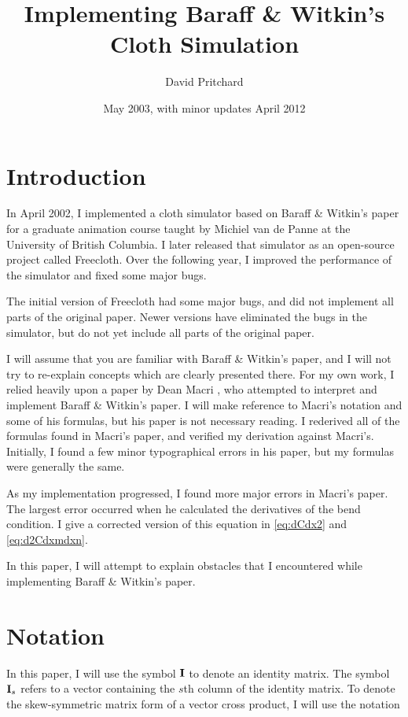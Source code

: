 \documentclass[twocolumn]{article}
\title{Implementing Baraff \& Witkin's Cloth Simulation}
\author{David Pritchard}
\date{May 2003, with minor updates April 2012}
\newcommand{\I}{{\bf I}}
\newcommand{\Is}{{\bf I}_s}
\begin{document}
\maketitle

\section{Introduction}

In April 2002, I implemented a cloth simulator based on Baraff \& Witkin's
paper \cite{baraff98} for a graduate animation course taught by Michiel van
de Panne at the University of British Columbia. I later released that
simulator as an open-source project called Freecloth. Over the following year,
I improved the performance of the simulator and fixed some major bugs.

The initial version of Freecloth had some major bugs, and did not implement
all parts of the original paper. Newer versions have eliminated the bugs in
the simulator, but do not yet include all parts of the original paper.

I will assume that you are familiar with Baraff \& Witkin's
paper, and I will not try to re-explain concepts which are clearly presented
there. For my own work, I relied heavily upon a paper by Dean Macri
\cite{macri00}, who attempted to interpret and implement Baraff \& Witkin's
paper. I will make reference to Macri's notation and some of his formulas,
but his paper is not necessary reading. I rederived all of the formulas found
in Macri's paper, and verified my derivation against Macri's. Initially, I
found a few minor typographical errors in his paper, but my formulas were
generally the same.

As my implementation progressed, I found more major errors in Macri's paper.
The largest error occurred when he calculated the derivatives of the bend
condition. I give a corrected version of this equation in \eqref{eq:dCdx2} and
\eqref{eq:d2Cdxmdxn}.

In this paper, I will attempt to explain obstacles that I encountered while
implementing Baraff \& Witkin's paper.

\section{Notation}

In this paper, I will use the symbol $\I$ to denote an identity matrix. The
symbol $\Is$ refers to a vector containing the $s$th column of the identity
matrix. To
denote the skew-symmetric matrix form of a vector cross product, I will use
the notation
\end{document}
